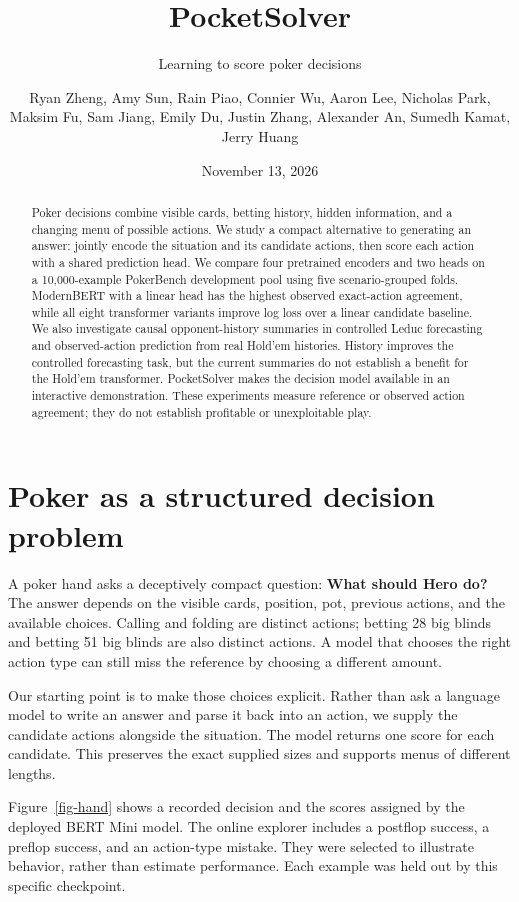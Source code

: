 \documentclass[
  11pt,
  letterpaper,
]{article}
\author{\parbox{0.95\textwidth}{\centering\pocketsolverauthors}}%
\title{PocketSolver}
\subtitle{Learning to score poker decisions}
\author{{Ryan Zheng}, {Amy Sun}, {Rain Piao}, {Connier Wu}, {Aaron Lee},
{Nicholas Park}, {Maksim Fu}, {Sam Jiang}, {Emily Du}, {Justin Zhang},
{Alexander An}, {Sumedh Kamat}, {Jerry Huang}}
\date{November 13, 2026}
\begin{document}
\maketitle
\begin{abstract}
Poker decisions combine visible cards, betting history, hidden
information, and a changing menu of possible actions. We study a compact
alternative to generating an answer: jointly encode the situation and
its candidate actions, then score each action with a shared prediction
head. We compare four pretrained encoders and two heads on a
10,000-example PokerBench development pool using five scenario-grouped
folds. ModernBERT with a linear head has the highest observed
exact-action agreement, while all eight transformer variants improve log
loss over a linear candidate baseline. We also investigate causal
opponent-history summaries in controlled Leduc forecasting and
observed-action prediction from real Hold'em histories. History improves
the controlled forecasting task, but the current summaries do not
establish a benefit for the Hold'em transformer. PocketSolver makes the
decision model available in an interactive demonstration. These
experiments measure reference or observed action agreement; they do not
establish profitable or unexploitable play.
\end{abstract}


\section{Poker as a structured decision
problem}\label{poker-as-a-structured-decision-problem}

A poker hand asks a deceptively compact question: \textbf{What should
Hero do?} The answer depends on the visible cards, position, pot,
previous actions, and the available choices. Calling and folding are
distinct actions; betting 28 big blinds and betting 51 big blinds are
also distinct actions. A model that chooses the right action type can
still miss the reference by choosing a different amount.

Our starting point is to make those choices explicit. Rather than ask a
language model to write an answer and parse it back into an action, we
supply the candidate actions alongside the situation. The model returns
one score for each candidate. This preserves the exact supplied sizes
and supports menus of different lengths.

Figure~\ref{fig-hand} shows a recorded decision and the scores assigned
by the deployed BERT Mini model. The online explorer includes a postflop
success, a preflop success, and an action-type mistake. They were
selected to illustrate behavior, rather than estimate performance. Each
example was held out by this specific checkpoint.
\end{document}
